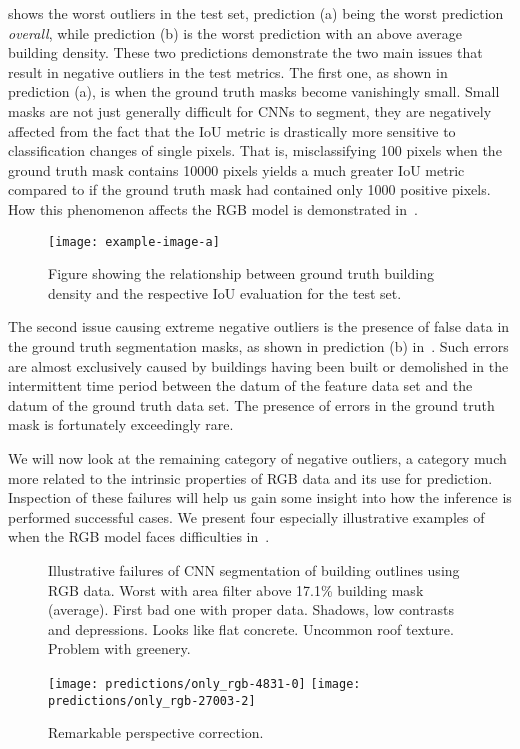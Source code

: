  shows the worst outliers in the test set, prediction (a) being the worst prediction \emph{overall}, while prediction (b) is the worst prediction with an above average building density. %
These two predictions demonstrate the two main issues that result in negative outliers in the test metrics.
The first one, as shown in prediction (a), is when the ground truth masks become vanishingly small.
Small masks are not just generally difficult for CNNs to segment, they are negatively affected from the fact that the IoU metric is drastically more sensitive to classification changes of single pixels.
That is, misclassifying 100 pixels when the ground truth mask contains \num{10000} pixels yields a much greater IoU metric compared to if the ground truth mask had contained only \num{1000} positive pixels.
How this phenomenon affects the RGB model is demonstrated in~.

\begin{figure}[H]
  \texttt{[image: example-image-a]}
  \caption{%
    Figure showing the relationship between ground truth building density and the respective IoU evaluation for the test set.
  }%
  \label{fig:rgb-density-relationship}
\end{figure}

The second issue causing extreme negative outliers is the presence of false data in the ground truth segmentation masks, as shown in prediction (b) in~.
Such errors are almost exclusively caused by buildings having been built or demolished in the intermittent time period between the datum of the feature data set and the datum of the ground truth data set.
The presence of errors in the ground truth mask is fortunately exceedingly rare.

We will now look at the remaining category of negative outliers, a category much more related to the intrinsic properties of RGB data and its use for prediction.
Inspection of these failures will help us gain some insight into how the inference is performed successful cases.
We present four especially illustrative examples of when the RGB model faces difficulties in~.

\begin{figure}[H]
  \centering
  \caption{%
    Illustrative failures of CNN segmentation of building outlines using RGB data.
    Worst with area filter above 17.1\% building mask (average).  First bad one with proper data.  Shadows, low contrasts and depressions.
    Looks like flat concrete.
    Uncommon roof texture.
    Problem with greenery.
  }%
  \label{fig:rgb-prediction-issues}
\end{figure}

\begin{figure}[H]
  \centering
  \texttt{[image: predictions/only\_rgb-4831-0]}  %
  \texttt{[image: predictions/only\_rgb-27003-2]}  %
  \caption{%
    Remarkable perspective correction. \\
  }%
  \label{fig:perspective-correction}
\end{figure}
